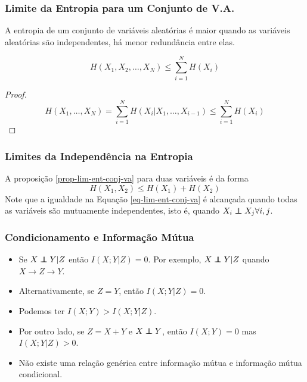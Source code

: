 \begin{frame}%
  \frametitle{Limite da Entropia para um Conjunto de V.A.}
  A entropia de um conjunto de variáveis aleatórias é maior quando as
  variáveis aleatórias são independentes, há menor redundância entre elas.
  \begin{proposition}\label{prop-lim-ent-conj-va}
  \begin{equation}\label{eq-lim-ent-conj-va}
  H(X_1, X_2, \ldots, X_N) \leq \sum_{i=1}^N H(X_i)
  \end{equation}
  \end{proposition}

  \begin{proof}
  \begin{equation}
  H(X_1, \ldots, X_N) = \sum_{i=1}^N H(X_i | X_1, \ldots, X_{i-1}) \leq \sum_{i=1}^N H(X_i)
  \end{equation}
  \end{proof}

\end{frame}

\begin{frame}%
  \frametitle{Limites da Independência na Entropia}
  A proposição \ref{prop-lim-ent-conj-va} para duas variáveis é da forma
  \begin{equation}
  H(X_1,X_2) \leq H(X_1) + H(X_2)
  \end{equation}
  Note que a igualdade na Equação \ref{eq-lim-ent-conj-va} é alcançada quando
  todas as variáveis são mutuamente independentes, isto é, quando $X_i \independent X_j \forall i,j$.
\end{frame}


\begin{frame}%
  \frametitle{Condicionamento e Informação Mútua}
  \begin{itemize}
  \item Se $X \independent Y|Z$ então $I(X;Y|Z)=0$. Por exemplo, $X \independent Y|Z$ quando
  $X \rightarrow Z \rightarrow Y$.
  \item Alternativamente, se $Z=Y$, então $I(X;Y|Z)=0$.
  \item Podemos ter $I(X;Y) > I(X;Y|Z)$.
  \item Por outro lado, se $Z=X+Y$ e $X \independent Y$, então $I(X;Y)=0$ mas 
  $I(X;Y|Z)>0$.
  \item Não existe uma relação genérica entre informação mútua e informação mútua condicional.
  \end{itemize}
\end{frame}

